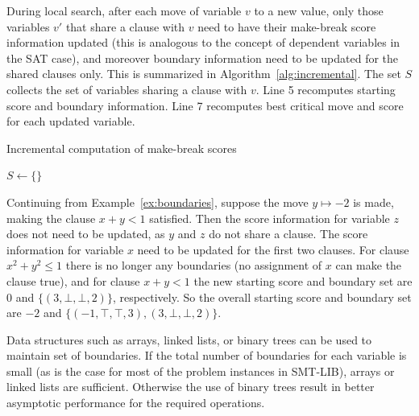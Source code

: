 \documentclass[runningheads]{llncs}
\begin{document}
During local search, after each move of variable $v$ to a new value, only those variables $v'$ that share a clause with $v$ need to have their make-break score information updated (this is analogous to the concept of dependent variables in the SAT case), and moreover boundary information need to be updated for the shared clauses only. This is summarized in Algorithm~\ref{alg:incremental}. The set $S$ collects the set of variables sharing a clause with $v$. Line 5 recomputes starting score and boundary information. Line 7 recomputes best critical move and score for each updated variable.

\begin{algorithm}[!t]
\caption{Incremental computation of make-break scores}
\label{alg:incremental}
$S \leftarrow \{\}$ 
\end{algorithm}

\begin{example}
\label{ex:update-boundary}
Continuing from Example~\ref{ex:boundaries}, suppose the move $y\mapsto -2$ is made, making the clause $x+y<1$ satisfied. Then the score information for variable $z$ does not need to be updated, as $y$ and $z$ do not share a clause. The score information for variable $x$ need to be updated for the first two clauses. For clause $x^2+y^2\le 1$ there is no longer any boundaries (no assignment of $x$ can make the clause true), and for clause $x+y<1$ the new starting score and boundary set are 0 and $\{(3,\bot,\bot,2)\}$, respectively. So the overall starting score and boundary set are $-2$ and $\{(-1,\top,\top,3),(3,\bot,\bot,2)\}$.
\end{example}

\begin{remark}
Data structures such as arrays, linked lists, or binary trees can be used to maintain set of boundaries. If the total number of boundaries for each variable is small (as is the case for most of the problem instances in SMT-LIB), arrays or linked lists are sufficient. Otherwise the use of binary trees result in better asymptotic performance for the required operations.
\end{remark}
\end{document}
